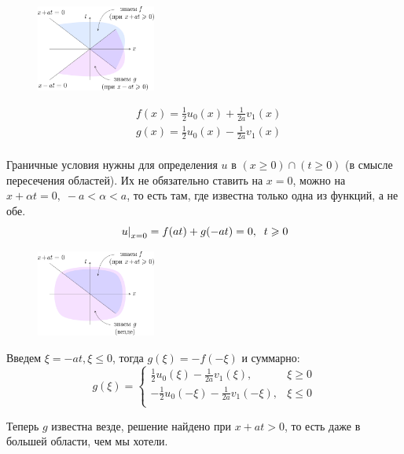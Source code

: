\documentclass[../main.tex]{subfiles}
\begin{document}
\begin{figure}
    \centering
    \includegraphics[width=0.35\textwidth]{./pic 4_1.pdf}
\end{figure}

\begin{align*}
    & f(x) = \frac{1}{2}u_0(x) + \frac{1}{2a}v_1(x) \\
    & g(x) = \frac{1}{2}u_0(x) - \frac{1}{2a}v_1(x) \\
\end{align*}

Граничные условия нужны для определения $u$ в $(x \geq 0)\cap(t \geq 0)$ (в смысле пересечения областей). Их не обязательно ставить на $x=0$, можно на $x + \alpha t = 0, \; -a < \alpha < a$, то есть там, где известна только одна из функций, а не обе.
$$
\left. u\right|_{x=0} = f(at) + g(-at)=0, \;\; t \geqslant 0
$$
\clearpage %

\begin{figure}
    \includegraphics[width=0.35\textwidth]{./pic 4_2.pdf}
\end{figure}

Введем $\xi = -at, \xi \leq 0$, тогда $g(\xi) = -f(-\xi)$ и суммарно:
\begin{equation*}
    g(\xi) = \begin{cases}
        \frac{1}{2}u_0(\xi)-\frac{1}{2a}v_1(\xi), & \xi \geq 0\\
        -\frac{1}{2}u_0(-\xi)-\frac{1}{2a}v_1(-\xi), & \xi \leq 0\\
    \end{cases}
\end{equation*}

Теперь $g$ известна везде, решение найдено при $x + at > 0$, то есть даже в большей области, чем мы хотели.
\end{document}
